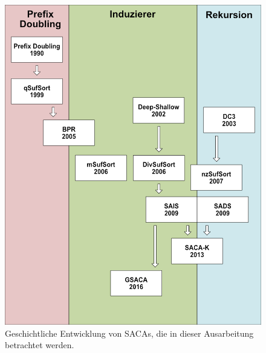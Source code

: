 \begin{figure}[H]
	\centering
	\includegraphics[width=\linewidth]{kapitel/5_saca_uebersicht/history/history3}
	\caption{Geschichtliche Entwicklung von SACAs, die in dieser Ausarbeitung betrachtet werden.}
	\label{fig_banane_1_2}
\end{figure}
